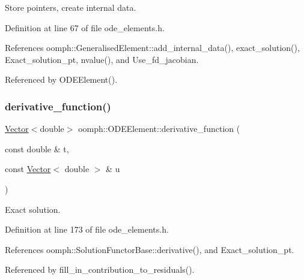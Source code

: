 Store pointers, create internal data. 



Definition at line 67 of file ode\+\_\+elements.\+h.



References oomph\+::\+Generalised\+Element\+::add\+\_\+internal\+\_\+data(), exact\+\_\+solution(), Exact\+\_\+solution\+\_\+pt, nvalue(), and Use\+\_\+fd\+\_\+jacobian.



Referenced by O\+D\+E\+Element().

\mbox{\label{classoomph_1_1ODEElement_a95369a0392e9e068ad2a85b78ba0cbb3}} 
\subsubsection{\texorpdfstring{derivative\+\_\+function()}{derivative\_function()}}
{\footnotesize\ttfamily \hyperlink{classoomph_1_1Vector}{Vector}$<$double$>$ oomph\+::\+O\+D\+E\+Element\+::derivative\+\_\+function (\begin{DoxyParamCaption}\item[{const double \&}]{t,  }\item[{const \hyperlink{classoomph_1_1Vector}{Vector}$<$ double $>$ \&}]{u }\end{DoxyParamCaption})\hspace{0.3cm}{\ttfamily [inline]}}



Exact solution. 



Definition at line 173 of file ode\+\_\+elements.\+h.



References oomph\+::\+Solution\+Functor\+Base\+::derivative(), and Exact\+\_\+solution\+\_\+pt.



Referenced by fill\+\_\+in\+\_\+contribution\+\_\+to\+\_\+residuals().

\mbox{\label{classoomph_1_1ODEElement_a4d5e0a3989f17428bbc9e8eca4470fe2}} 
